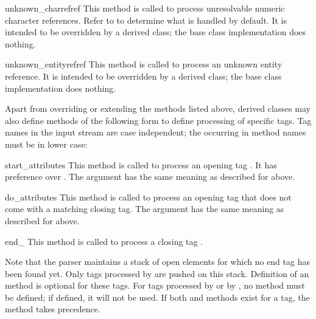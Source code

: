 \begin{methoddesc}{unknown_charref}{ref}
This method is called to process unresolvable numeric character
references.  Refer to  to determine what is
handled by default.  It is intended to be overridden by a derived
class; the base class implementation does nothing.
\end{methoddesc}

\begin{methoddesc}{unknown_entityref}{ref}
This method is called to process an unknown entity reference.  It is
intended to be overridden by a derived class; the base class
implementation does nothing.
\end{methoddesc}

Apart from overriding or extending the methods listed above, derived
classes may also define methods of the following form to define
processing of specific tags.  Tag names in the input stream are case
independent; the  occurring in method names must be in lower
case:

\begin{methoddescni}{start_}{attributes}
This method is called to process an opening tag .  It has
preference over .  The
 argument has the same meaning as described for
 above.
\end{methoddescni}

\begin{methoddescni}{do_}{attributes}
This method is called to process an opening tag  that does
not come with a matching closing tag.  The  argument
has the same meaning as described for  above.
\end{methoddescni}

\begin{methoddescni}{end_}{}
This method is called to process a closing tag .
\end{methoddescni}

Note that the parser maintains a stack of open elements for which no
end tag has been found yet.  Only tags processed by
 are pushed on this stack.  Definition of an
 method is optional for these tags.  For tags
processed by  or by , no
 method must be defined; if defined, it will
not be used.  If both  and
 methods exist for a tag, the
 method takes precedence.
